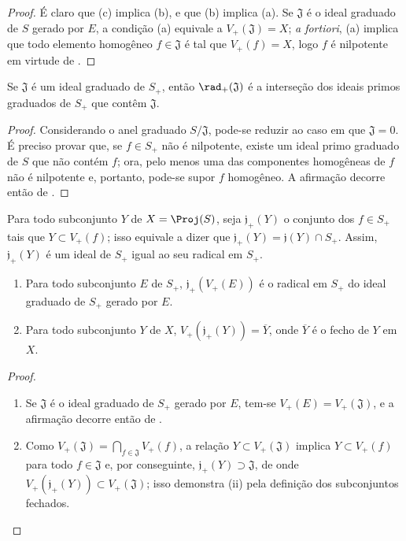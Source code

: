 \documentclass[oneside,10pt]{amsart}
\let\EGAOriginalLabel\label
\renewcommand{\label}[1]{\phantomsection\EGAOriginalLabel{#1}}
\begin{document}
\begin{proof}
É claro que (c) implica (b), e que (b) implica (a).
Se $\mathfrak{J}$ é o ideal graduado de $S$ gerado por $E$, a condição (a) equivale a $V_+(\mathfrak{J})=X$; \emph{a fortiori}, (a) implica que todo elemento homogêneo $f\in\mathfrak{J}$ é tal que $V_+(f)=X$, logo $f$ é nilpotente em virtude de .
\end{proof}

\begin{corollary}[2.3.9]
\label{II.2.3.9}
Se $\mathfrak{J}$ é um ideal graduado de $S_+$, então $\rad_+(\mathfrak{J})$ é a interseção dos ideais primos graduados de $S_+$ que contêm $\mathfrak{J}$.
\end{corollary}

\begin{proof}
Considerando o anel graduado $S/\mathfrak{J}$, pode-se reduzir ao caso em que $\mathfrak{J}=0$.
É preciso provar que, se $f\in S_+$ não é nilpotente, existe um ideal primo graduado de $S$ que não contém $f$; ora, pelo menos uma das componentes homogêneas de $f$ não é nilpotente e, portanto, pode-se supor $f$ homogêneo.
A afirmação decorre então de .
\end{proof}

\begin{env}[2.3.10]
\label{II.2.3.10}
Para todo subconjunto $Y$ de $X=\Proj(S)$, seja $\mathfrak{j}_+(Y)$ o conjunto dos $f\in S_+$ tais que $Y\subset V_+(f)$; isso equivale a dizer que $\mathfrak{j}_+(Y)=\mathfrak{j}(Y)\cap S_+$.
Assim, $\mathfrak{j}_+(Y)$ é um ideal de $S_+$ igual ao seu radical em $S_+$.
\end{env}

\begin{proposition}[2.3.11]
\label{II.2.3.11}
\begin{enumerate}
  \item[\rm(i)] Para todo subconjunto $E$ de $S_+$, $\mathfrak{j}_+(V_+(E))$ é o radical em $S_+$ do ideal graduado de $S_+$ gerado por $E$.
  \item[\rm(ii)] Para todo subconjunto $Y$ de $X$, $V_+(\mathfrak{j}_+(Y))=\overline{Y}$, onde $\overline{Y}$ é o fecho de $Y$ em $X$.
\end{enumerate}
\end{proposition}

\begin{proof}
\medskip\noindent
\begin{enumerate}
  \item[\rm(i)] Se $\mathfrak{J}$ é o ideal graduado de $S_+$ gerado por $E$, tem-se $V_+(E)=V_+(\mathfrak{J})$, e a afirmação decorre então de .
  \item[\rm(ii)] Como $V_+(\mathfrak{J})=\bigcap_{f\in\mathfrak{J}}V_+(f)$, a relação $Y\subset V_+(\mathfrak{J})$ implica $Y\subset V_+(f)$ para todo $f\in\mathfrak{J}$ e, por conseguinte, $\mathfrak{j}_+(Y)\supset\mathfrak{J}$, de onde $V_+(\mathfrak{j}_+(Y))\subset V_+(\mathfrak{J})$; isso demonstra (ii) pela definição dos subconjuntos fechados.
\end{enumerate}
\end{proof}
\end{document}
